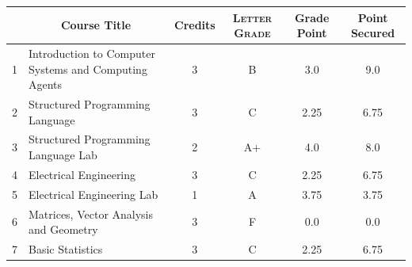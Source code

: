 \documentclass[11pt]{article}
\newcommand*{\numtwo}[1]{\pgfmathprintnumber[
                    fixed, precision=2, fixed zerofill=true]{#1}}
\begin{document}
                \begin{center}
                    \renewcommand{\arraystretch}{1.08}
                    
                \begin{tabular}{|c|l|c|>{\scshape}c|c|c|}
                \hline  \rule[-1ex]{0pt}{3.5ex} {\centering{\bf Course Code}} &  \multicolumn{1}{c|}{\textbf{Course Title}}  & {\bf Credits} & {\bf Letter Grade} & {\bf Grade Point} & {\bf Point Secured}  \\ 
                \hline   1 &  Introduction to Computer Systems and Computing Agents		 & 3 & B & 3.0 & 9.0 \\ %
                \hline   2 &  Structured Programming Language		 & 3 & C & 2.25 & 6.75 \\ %
                \hline   3 &  Structured Programming Language Lab		 & 2 & A+ & 4.0 & 8.0 \\ %
                \hline   4 &  Electrical Engineering		 & 3 & C & 2.25 & 6.75 \\ %
                \hline   5 &  Electrical Engineering Lab		 & 1 & A & 3.75 & 3.75 \\ %
                \hline   6 &  Matrices, Vector Analysis and Geometry		 & 3 & F & 0.0 & 0.0 \\ %
                \hline   7 &  Basic Statistics		 & 3 & C & 2.25 & 6.75 \\ %

\hline                %
                \end{tabular}
                \end{center}
                \renewcommand{\arraystretch}{1.03}
\end{document}

